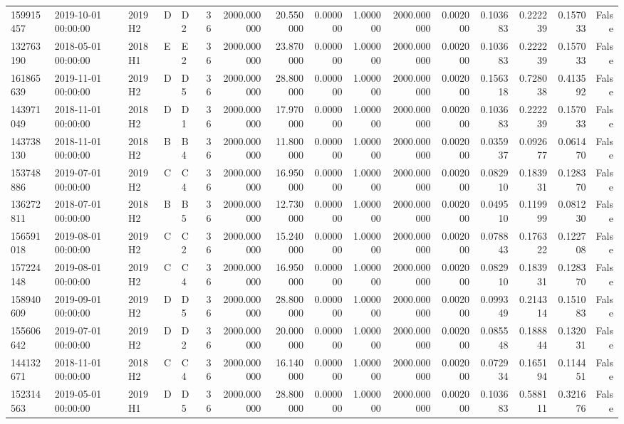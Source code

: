 \begin{tabular}{lllllrrrrrrrrrrr}
159915457 & 2019-10-01 00:00:00 & 2019H2 & D & D2 & 36 & 2000.000000 & 20.550000 & 0.000000 & 1.000000 & 2000.000000 & 0.002000 & 0.103683 & 0.222239 & 0.157033 & False \\
132763190 & 2018-05-01 00:00:00 & 2018H1 & E & E2 & 36 & 2000.000000 & 23.870000 & 0.000000 & 1.000000 & 2000.000000 & 0.002000 & 0.103683 & 0.222239 & 0.157033 & False \\
161865639 & 2019-11-01 00:00:00 & 2019H2 & D & D5 & 36 & 2000.000000 & 28.800000 & 0.000000 & 1.000000 & 2000.000000 & 0.002000 & 0.156318 & 0.728038 & 0.413592 & False \\
143971049 & 2018-11-01 00:00:00 & 2018H2 & D & D1 & 36 & 2000.000000 & 17.970000 & 0.000000 & 1.000000 & 2000.000000 & 0.002000 & 0.103683 & 0.222239 & 0.157033 & False \\
143738130 & 2018-11-01 00:00:00 & 2018H2 & B & B4 & 36 & 2000.000000 & 11.800000 & 0.000000 & 1.000000 & 2000.000000 & 0.002000 & 0.035937 & 0.092677 & 0.061470 & False \\
153748886 & 2019-07-01 00:00:00 & 2019H2 & C & C4 & 36 & 2000.000000 & 16.950000 & 0.000000 & 1.000000 & 2000.000000 & 0.002000 & 0.082910 & 0.183931 & 0.128370 & False \\
136272811 & 2018-07-01 00:00:00 & 2018H2 & B & B5 & 36 & 2000.000000 & 12.730000 & 0.000000 & 1.000000 & 2000.000000 & 0.002000 & 0.049510 & 0.119999 & 0.081230 & False \\
156591018 & 2019-08-01 00:00:00 & 2019H2 & C & C2 & 36 & 2000.000000 & 15.240000 & 0.000000 & 1.000000 & 2000.000000 & 0.002000 & 0.078843 & 0.176322 & 0.122708 & False \\
157224148 & 2019-08-01 00:00:00 & 2019H2 & C & C4 & 36 & 2000.000000 & 16.950000 & 0.000000 & 1.000000 & 2000.000000 & 0.002000 & 0.082910 & 0.183931 & 0.128370 & False \\
158940609 & 2019-09-01 00:00:00 & 2019H2 & D & D5 & 36 & 2000.000000 & 28.800000 & 0.000000 & 1.000000 & 2000.000000 & 0.002000 & 0.099349 & 0.214314 & 0.151083 & False \\
155606642 & 2019-07-01 00:00:00 & 2019H2 & D & D2 & 36 & 2000.000000 & 20.000000 & 0.000000 & 1.000000 & 2000.000000 & 0.002000 & 0.085548 & 0.188844 & 0.132031 & False \\
144132671 & 2018-11-01 00:00:00 & 2018H2 & C & C4 & 36 & 2000.000000 & 16.140000 & 0.000000 & 1.000000 & 2000.000000 & 0.002000 & 0.072934 & 0.165194 & 0.114451 & False \\
152314563 & 2019-05-01 00:00:00 & 2019H1 & D & D5 & 36 & 2000.000000 & 28.800000 & 0.000000 & 1.000000 & 2000.000000 & 0.002000 & 0.103683 & 0.588111 & 0.321676 & False \\

\end{tabular}
